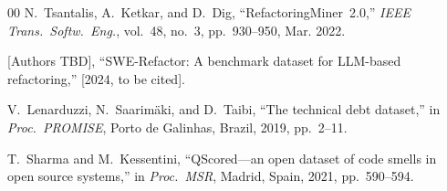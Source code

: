\documentclass[conference]{IEEEtran}
\begin{document}
\begin{thebibliography}{00}
N.~Tsantalis, A.~Ketkar, and D.~Dig,
``RefactoringMiner~2.0,''
\emph{IEEE Trans.\ Softw.\ Eng.},
vol.~48, no.~3, pp.~930--950, Mar. 2022.

[Authors TBD],
``SWE-Refactor: A benchmark dataset for LLM-based refactoring,''
[2024, to be cited].

V.~Lenarduzzi, N.~Saarimäki, and D.~Taibi,
``The technical debt dataset,''
in \emph{Proc.\ PROMISE}, Porto de Galinhas, Brazil, 2019,
pp.~2--11.

T.~Sharma and M.~Kessentini,
``QScored---an open dataset of code smells in open source systems,''
in \emph{Proc.\ MSR}, Madrid, Spain, 2021, pp.~590--594.

\end{thebibliography}
\end{document}
